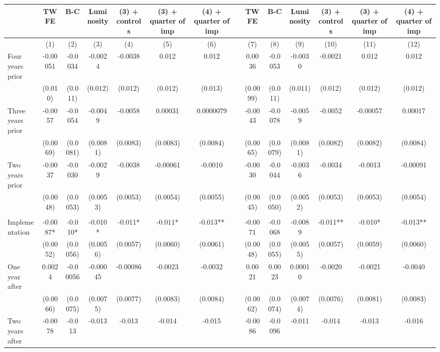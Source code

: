 \begin{tabular}{lccccccccccccc}
\toprule
      & TWFE  & B-C   & Luminosity & (3) + controls & (3) + quarter of imp & (4) + quarter of imp &       & TWFE  & B-C   & Luminosity & (3) + controls & (3) + quarter of imp & (4) + quarter of imp \\
\midrule
      & (1)   & (2)   & (3)   & (4)   & (5)   & (6)   &       & (7)   & (8)   & (9)   & (10)  & (11)  & (12) \\
\midrule
\midrule
Four years prior & -0.00051 & -0.0034 & -0.0024 & -0.0038 & 0.012 & 0.012 &       & 0.0036 & -0.0053 & -0.0030 & -0.0021 & 0.012 & 0.012 \\
      & (0.010) & (0.011) & (0.012) & (0.012) & (0.012) & (0.013) &       & (0.0099) & (0.011) & (0.011) & (0.012) & (0.012) & (0.012) \\
Three years prior & -0.0057 & -0.0054 & -0.0049 & -0.0058 & 0.00031 & 0.0000079 &       & -0.0043 & -0.0078 & -0.0059 & -0.0052 & -0.00057 & 0.00017 \\
      & (0.0069) & (0.0081) & (0.0081) & (0.0083) & (0.0083) & (0.0084) &       & (0.0065) & (0.0079) & (0.0081) & (0.0082) & (0.0082) & (0.0084) \\
Two years prior & -0.0037 & -0.0030 & -0.0029 & -0.0038 & -0.00061 & -0.0010 &       & -0.0030 & -0.0044 & -0.0036 & -0.0034 & -0.0013 & -0.00091 \\
      & (0.0048) & (0.0053) & (0.0053) & (0.0053) & (0.0054) & (0.0055) &       & (0.0045) & (0.0050) & (0.0052) & (0.0053) & (0.0053) & (0.0054) \\
      &       &       &       &       &       &       &       &       &       &       &       &       &  \\
Implementation & -0.0087* & -0.010* & -0.010* & -0.011* & -0.011* & -0.013** &       & -0.0071 & -0.0068 & -0.0089 & -0.011** & -0.010* & -0.013** \\
      & (0.0052) & (0.0056) & (0.0056) & (0.0057) & (0.0060) & (0.0061) &       & (0.0048) & (0.0055) & (0.0055) & (0.0057) & (0.0059) & (0.0060) \\
One year after & 0.0024 & -0.00056 & -0.00045 & -0.00086 & -0.0023 & -0.0032 &       & 0.0021 & 0.0023 & 0.00010 & -0.0020 & -0.0021 & -0.0040 \\
      & (0.0066) & (0.0075) & (0.0075) & (0.0077) & (0.0083) & (0.0084) &       & (0.0062) & (0.0074) & (0.0074) & (0.0076) & (0.0081) & (0.0083) \\
Two years after & -0.0078 & -0.013 & -0.013 & -0.013 & -0.014 & -0.015 &       & -0.0086 & -0.0096 & -0.011 & -0.014 & -0.013 & -0.016 \\

\end{tabular}
